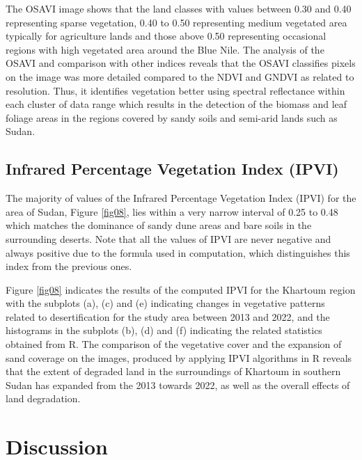\documentclass[jimaging,article,submit,pdftex,moreauthors]{Definitions/mdpi}
\begin{document}
The OSAVI image shows that the land classes with values between 0.30 and 0.40 representing sparse vegetation, 0.40 to 0.50 representing medium vegetated area typically for agriculture lands and those above 0.50 representing occasional regions with high vegetated area around the Blue Nile. The analysis of the OSAVI and comparison with other indices reveals that the OSAVI classifies pixels on the image was more detailed compared to the NDVI and GNDVI as related to resolution. Thus, it identifies vegetation better using spectral reflectance within each cluster of data range which results in the detection of the biomass and leaf foliage areas in the regions covered by sandy soils and semi-arid lands such as Sudan. 

\subsection{Infrared Percentage Vegetation Index (IPVI)}

The majority of values of the Infrared Percentage Vegetation Index (IPVI) for the area of Sudan, Figure \ref{fig08}, lies within a very narrow interval of 0.25 to 0.48 which matches the dominance of sandy dune areas and bare soils in the surrounding deserts. Note that all the values of IPVI are never negative and always positive due to the formula used in computation, which distinguishes this index from the previous ones. 

Figure \ref{fig08} indicates the results of the computed IPVI for the Khartoum region with the subplots (a), (c) and (e) indicating changes in vegetative patterns related to desertification for the study area between 2013 and 2022, and the histograms in the subplots (b), (d) and (f) indicating the related statistics obtained from R. The comparison of the vegetative cover and the expansion of sand coverage on the images, produced by applying IPVI algorithms in R reveals that the extent of degraded land in the surroundings of Khartoum in southern Sudan has expanded from the 2013 towards 2022, as well as the overall effects of land degradation.

\section{Discussion}
\end{document}
